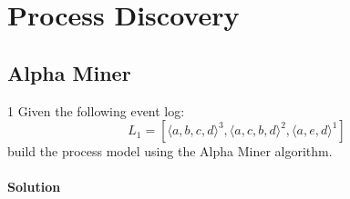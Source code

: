\section{Process Discovery}
\subsection{Alpha Miner}

\begin{exercise}{1}
Given the following event log:
\[L_1 = [\langle a,b,c,d \rangle^3, \langle a,c,b,d \rangle^2, \langle a,e,d \rangle^1]\]
build the process model using the Alpha Miner algorithm.
\end{exercise}
\paragraph{Solution}
